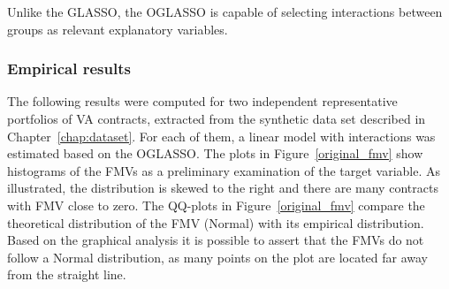 Unlike the GLASSO, the OGLASSO is capable of selecting interactions between groups as relevant explanatory variables.
\subsubsection*{Empirical results}\label{empirical_results}

The following results were computed for two independent representative portfolios of VA contracts, extracted from the synthetic data set described in Chapter~\ref{chap:dataset}. For each of them, a linear model with interactions was estimated based on the OGLASSO. The plots in Figure~\ref{original_fmv} show histograms of the FMVs as a preliminary examination of the target variable. As illustrated, the distribution is skewed to the right and there are many contracts with FMV close to zero. The QQ-plots in Figure~\ref{original_fmv} compare the theoretical distribution of the FMV (Normal) with its empirical distribution. Based on the graphical analysis it is possible to assert that the FMVs do not follow a Normal distribution, as many points on the plot are located far away from the straight line.

